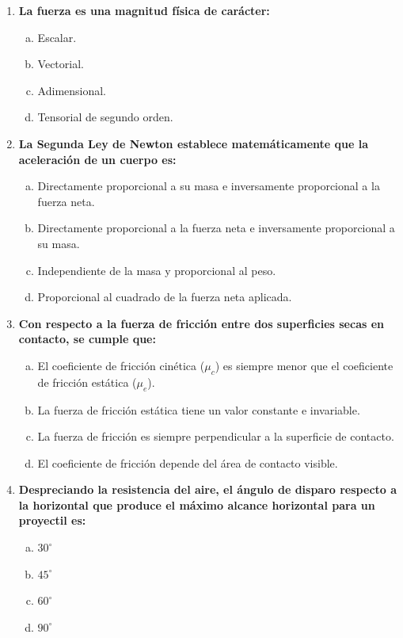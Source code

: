 \documentclass[11pt,a4paper]{article}
\begin{document}
\begin{enumerate}
    \item \textbf{La fuerza es una magnitud física de carácter:}
    \begin{enumerate}[a)]
        \item Escalar.
        \item Vectorial.
        \item Adimensional.
        \item Tensorial de segundo orden.
    \end{enumerate}

    \item \textbf{La Segunda Ley de Newton establece matemáticamente que la aceleración de un cuerpo es:}
    \begin{enumerate}[a)]
        \item Directamente proporcional a su masa e inversamente proporcional a la fuerza neta.
        \item Directamente proporcional a la fuerza neta e inversamente proporcional a su masa.
        \item Independiente de la masa y proporcional al peso.
        \item Proporcional al cuadrado de la fuerza neta aplicada.
    \end{enumerate}

    \item \textbf{Con respecto a la fuerza de fricción entre dos superficies secas en contacto, se cumple que:}
    \begin{enumerate}[a)]
        \item El coeficiente de fricción cinética ($\mu_c$) es siempre menor que el coeficiente de fricción estática ($\mu_e$).
        \item La fuerza de fricción estática tiene un valor constante e invariable.
        \item La fuerza de fricción es siempre perpendicular a la superficie de contacto.
        \item El coeficiente de fricción depende del área de contacto visible.
    \end{enumerate}

    \item \textbf{Despreciando la resistencia del aire, el ángulo de disparo respecto a la horizontal que produce el máximo alcance horizontal para un proyectil es:}
    \begin{enumerate}[a)]
        \item $30^\circ$
        \item $45^\circ$
        \item $60^\circ$
        \item $90^\circ$
    \end{enumerate}


\end{enumerate}
\end{document}
